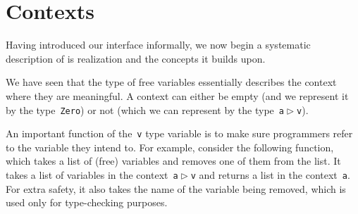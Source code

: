 \documentclass[9pt,preprint,authoryear]{sigplanconf}
\begin{document}
\section{Contexts\label{contextSec}}

%
Having introduced our interface informally, we now begin a
           systematic description of is realization and the concepts it builds upon.%


%
We have seen that the type of free variables essentially describes
    the context where they are meaningful. A context can either be
    empty (and we represent it by the type{~}\textcolor[rgb]{0,0,0.80}{\texttt{Zero}}) or not (which we
    can represent by the type{~}\textcolor[rgb]{0,0,0.80}{\texttt{a}}\textcolor[rgb]{0,0,0.80}{\texttt{\mbox{\hspace{0.50em}}}}\textcolor[rgb]{0,0,0.80}{\texttt{$ \vartriangleright $}}\textcolor[rgb]{0,0,0.80}{\texttt{\mbox{\hspace{0.50em}}}}\textcolor[rgb]{0,0,0.80}{\texttt{v}}).%


%
An important function of the{~}\textcolor[rgb]{0,0,0.80}{\texttt{v}} type variable is to make sure
    programmers refer to the variable they intend to. For example,
    consider the following function, which takes a list of (free)
    variables and removes one of them from the list. It takes a list
    of variables in the context{~}\textcolor[rgb]{0,0,0.80}{\texttt{a}}\textcolor[rgb]{0,0,0.80}{\texttt{\mbox{\hspace{0.50em}}}}\textcolor[rgb]{0,0,0.80}{\texttt{$ \vartriangleright $}}\textcolor[rgb]{0,0,0.80}{\texttt{\mbox{\hspace{0.50em}}}}\textcolor[rgb]{0,0,0.80}{\texttt{v}} and returns a list in the
    context{~}\textcolor[rgb]{0,0,0.80}{\texttt{a}}. For extra safety, it also takes the name of the
    variable being removed, which is used only for type-checking
    purposes.%


{\nopagebreak }
\end{document}
